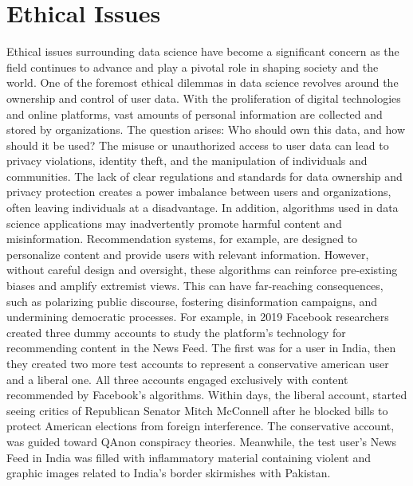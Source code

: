 \documentclass{vgtc}                          %
\begin{document}
\section{Ethical Issues}

Ethical issues surrounding data science have become a significant concern as the field continues to advance and play a pivotal role in shaping society and the world. One of the foremost ethical dilemmas 
in data science revolves around the ownership and control of user data. With the proliferation of digital technologies and online platforms, vast amounts of personal information are collected and stored 
by organizations. The question arises: Who should own this data, and how should it be used? The misuse or unauthorized access to user data can lead to privacy violations, identity theft, and the manipulation 
of individuals and communities. The lack of clear regulations and standards for data ownership and privacy protection creates a power imbalance between users and organizations, often leaving individuals at a 
disadvantage. In addition, algorithms used in data science applications may inadvertently promote harmful content and misinformation. Recommendation systems, for example, are designed to personalize content 
and provide users with relevant information. However, without careful design and oversight, these algorithms can reinforce pre-existing biases and amplify extremist views. This can have far-reaching consequences, 
such as polarizing public discourse, fostering disinformation campaigns, and undermining democratic processes. For example, in 2019 Facebook researchers 
created three dummy accounts to study the platform's technology for recommending content in the News Feed. The first was for a user in India, then they created two more test accounts to 
represent a conservative american user and a liberal one. All three accounts engaged exclusively with content recommended by Facebook's algorithms. Within days, the liberal account, started seeing critics of 
Republican Senator Mitch McConnell after he blocked bills to protect American elections from foreign interference. The conservative account, was guided toward QAnon conspiracy theories. Meanwhile, the test 
user's News Feed in India was filled with inflammatory material containing violent and graphic images related to India's border skirmishes with Pakistan.\cite{Bidar:2021}\newline
\end{document}
